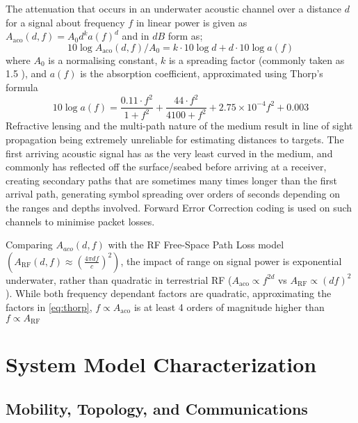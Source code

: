 The attenuation that occurs in an underwater acoustic channel over a distance $d$ for a signal about frequency $f$ in linear power is given as $A_{\text{aco}}(d,f) = A_0d^ka(f)^d$ and in $dB$ form as;
%
\begin{equation}
	\label{eq:acoattenuationdb}
	10 \log A_{\text{aco}}(d,f)/A_0 = k \cdot 10 \log d + d \cdot 10 \log a(f)
\end{equation}
%
where $A_0$ is a normalising constant, $k$ is a spreading factor (commonly taken as 1.5  \cite{Stojanovic2007}), and $a(f)$ is the absorption coefficient, approximated using Thorp's formula \cite{Stefanov2011}
%
\begin{equation}
	\label{eq:thorp}
	10 \log a(f) = \frac{0.11 \cdot f^2}{1+f^2} + \frac{44\cdot f^2}{4100+f^2}+ 2.75\times10^{-4} f^2 + 0.003
\end{equation}
%
Refractive lensing and the multi-path nature of the medium result in line of sight propagation being extremely unreliable for estimating distances to targets.
The first arriving acoustic signal has as the very least curved in the medium, and commonly has reflected off the surface/seabed before arriving at a receiver, creating secondary paths that are sometimes many times longer than the first arrival path, generating symbol spreading over orders of seconds depending on the ranges and depths involved.
Forward Error Correction coding is used on such channels to minimise packet losses.

Comparing $A_{aco}(d,f)$ with the RF Free-Space Path Loss model $(A_{\text{RF}}(d,f) \approx \left( \frac{4\pi d f}{c} \right)^2)$, the impact of range on signal power is exponential underwater, rather than quadratic in terrestrial RF ($A_{\text{aco}} \propto f^{2d}$ vs $A_{\text{RF}} \propto (df)^2$). 
While both frequency dependant factors are quadratic, approximating the factors in \eqref{eq:thorp}, $f\propto A_{\text{aco}}$ is at least 4 orders of magnitude higher than $f\propto A_{\text{RF}}$



\section{System Model Characterization}\label{sec:initialsystemcharacterization}


\subsection{Mobility, Topology, and Communications}

